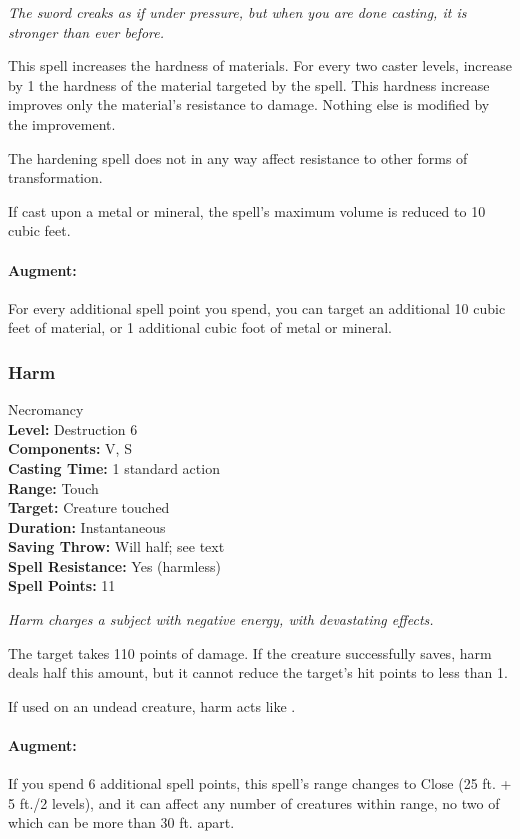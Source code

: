 \emph{The sword creaks as if under pressure, but when you are done casting, it is stronger than ever before.}

This spell increases the hardness of materials. For every two caster levels, 
increase by 1 the hardness of the material targeted by the spell. 
This hardness increase improves only the material's resistance to damage. 
Nothing else is modified by the improvement.

The hardening spell does not in any way affect resistance to other forms of transformation.

If cast upon a metal or mineral, the spell's maximum volume is reduced to 10 cubic feet. 

\paragraph{Augment:} For every additional spell point you spend, 
you can target an additional 10 cubic feet of material, 
or 1 additional cubic foot of metal or mineral.
\subsubsection{Harm}
\label{Spell:Harm}
Necromancy
\\ \textbf{Level:} Destruction 6
\\ \textbf{Components:} V, S
\\ \textbf{Casting Time:} 1 standard action
\\ \textbf{Range:} Touch
\\ \textbf{Target:} Creature touched
\\ \textbf{Duration:} Instantaneous
\\ \textbf{Saving Throw:} Will half; see text
\\ \textbf{Spell Resistance:} Yes (harmless)
\\ \textbf{Spell Points:} 11

\emph{Harm charges a subject with negative energy, with devastating effects.} 

The target takes 110 points of damage.
If the creature successfully saves, harm deals half this amount, but it cannot reduce the target's hit points to less than 1.

If used on an undead creature, harm acts like .

\paragraph{Augment:} If you spend 6 additional spell points, 
this spell's range changes to Close (25 ft. + 5 ft./2 levels), and it can affect any number of creatures within range,
no two of which can be more than 30 ft. apart.

